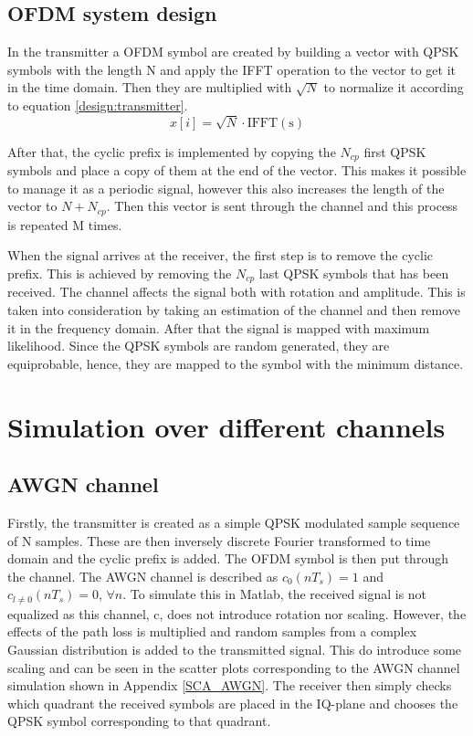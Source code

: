 \documentclass[conference]{IEEEtran}
\begin{document}
\subsection{OFDM system design}

In the transmitter a OFDM symbol are created by building a vector with QPSK symbols with the length N and apply the IFFT operation to the vector to get it in the time domain. Then they are multiplied with $\sqrt{N}$ to normalize it according to equation \ref{design:transmitter}.  
\begin{equation}
     x[i] = \sqrt{N} \cdot \mathrm{IFFT(s)}
     \label{design:transmitter}
\end{equation}

After that, the cyclic prefix is implemented by copying the $N_{cp}$ first QPSK symbols and place a copy of them at the end of the vector. This makes it possible to manage it as a periodic signal, however this also increases the length of the vector to $N+N_{cp}$. Then this vector is sent through the channel and this process is repeated M times. 

When the signal arrives at the receiver, the first step is to remove the cyclic prefix. This is achieved by removing the $N_{cp}$ last QPSK symbols that has been received. The channel affects the signal both with rotation and amplitude. This is taken into consideration by taking an estimation of the channel and then remove it in the frequency domain. After that the signal is mapped with maximum likelihood. Since the QPSK symbols are random generated, they are equiprobable, hence, they are mapped to the symbol with the minimum distance.   



\section{Simulation over different channels}

\subsection{AWGN channel}
Firstly, the transmitter is created as a simple QPSK modulated sample sequence of N samples. These are then inversely discrete Fourier transformed to time domain and the cyclic prefix is added. The OFDM symbol is then put through the channel.
The AWGN channel is described as $\mathit{c_0(nT_s) = 1}$ and $\mathit{c_{l \neq 0}(nT_s) = 0 }$, $\forall{n}$. To simulate this in Matlab, the received signal is not equalized as this channel, c, does not introduce rotation nor scaling. However, the effects of the path loss is multiplied and random samples from a complex Gaussian distribution is added to the transmitted signal. This do introduce some scaling and can be seen in the scatter plots corresponding to the AWGN channel simulation shown in Appendix \ref{SCA_AWGN}. The receiver then simply checks which quadrant the received symbols are placed in the IQ-plane and chooses the QPSK symbol corresponding to that quadrant.
\end{document}
